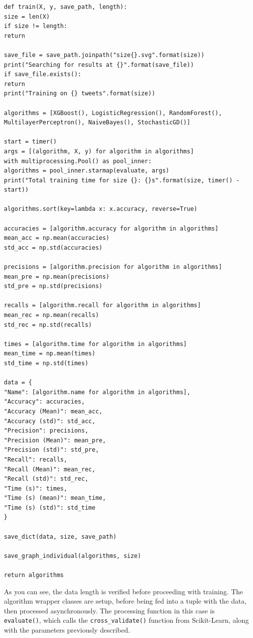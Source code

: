 \documentclass{article}
\begin{document}
\begin{lstlisting}
def train(X, y, save_path, length):
size = len(X)
if size != length:
return

save_file = save_path.joinpath("size{}.svg".format(size))
print("Searching for results at {}".format(save_file))
if save_file.exists():
return
print("Training on {} tweets".format(size))

algorithms = [XGBoost(), LogisticRegression(), RandomForest(),
MultilayerPerceptron(), NaiveBayes(), StochasticGD()]

start = timer()
args = [(algorithm, X, y) for algorithm in algorithms]
with multiprocessing.Pool() as pool_inner:
algorithms = pool_inner.starmap(evaluate, args)
print("Total training time for size {}: {}s".format(size, timer() - start))

algorithms.sort(key=lambda x: x.accuracy, reverse=True)

accuracies = [algorithm.accuracy for algorithm in algorithms]
mean_acc = np.mean(accuracies)
std_acc = np.std(accuracies)

precisions = [algorithm.precision for algorithm in algorithms]
mean_pre = np.mean(precisions)
std_pre = np.std(precisions)

recalls = [algorithm.recall for algorithm in algorithms]
mean_rec = np.mean(recalls)
std_rec = np.std(recalls)

times = [algorithm.time for algorithm in algorithms]
mean_time = np.mean(times)
std_time = np.std(times)

data = {
"Name": [algorithm.name for algorithm in algorithms],
"Accuracy": accuracies,
"Accuracy (Mean)": mean_acc,
"Accuracy (std)": std_acc,
"Precision": precisions,
"Precision (Mean)": mean_pre,
"Precision (std)": std_pre,
"Recall": recalls,
"Recall (Mean)": mean_rec,
"Recall (std)": std_rec,
"Time (s)": times,
"Time (s) (mean)": mean_time,
"Time (s) (std)": std_time
}

save_dict(data, size, save_path)

save_graph_individual(algorithms, size)

return algorithms
\end{lstlisting}

As you can see, the data length is verified before proceeding with training.
The algorithm wrapper classes are setup, before being fed into a tuple with the data, then processed asynchronously.
The processing function in this case is \lstinline{evaluate()}, which calls the \lstinline{cross_validate()} function from Scikit-Learn, along with the parameters previously described.
\end{document}

